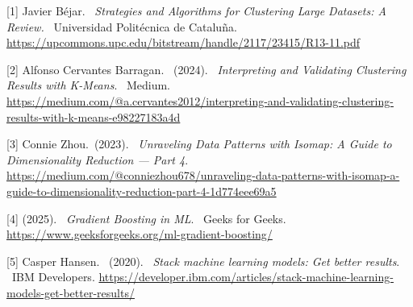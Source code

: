 \documentclass{article}
\begin{document}
{
\small


[1] Javier Béjar. \ \textit{Strategies and Algorithms for Clustering Large Datasets: A
Review.} \ Universidad Politécnica de Cataluña.
\url{https://upcommons.upc.edu/bitstream/handle/2117/23415/R13-11.pdf}


[2] Alfonso Cervantes Barragan. \ (2024). \ \textit{Interpreting and Validating Clustering Results with K-Means}. 
\ Medium. 
\url{https://medium.com/@a.cervantes2012/interpreting-and-validating-clustering-results-with-k-means-e98227183a4d}


[3] Connie Zhou.\ (2023). \ \textit{Unraveling Data Patterns with Isomap: A Guide to Dimensionality Reduction — Part 4}.
\url{https://medium.com/@conniezhou678/unraveling-data-patterns-with-isomap-a-guide-to-dimensionality-reduction-part-4-1d774eee69a5}

[4] (2025). \ \textit{Gradient Boosting in ML}. \ Geeks for Geeks.
\url{https://www.geeksforgeeks.org/ml-gradient-boosting/}

[5] Casper Hansen. \ (2020). \ \textit{Stack machine learning models: Get better results}. \ IBM Developers.
\url{https://developer.ibm.com/articles/stack-machine-learning-models-get-better-results/}

}

\end{document}
